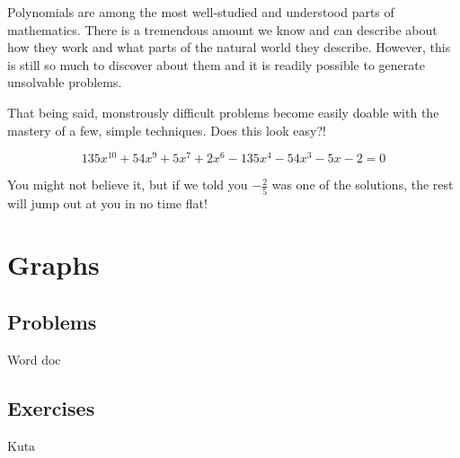 

Polynomials are among the most well-studied and understood parts of mathematics.
There is a tremendous amount we know and can describe about how they work
and what parts of the natural world they describe.  However, this is still so much
to discover about them and it is readily possible to generate unsolvable problems.

That being said, monstrously difficult problems become easily doable with the mastery
of a few, simple techniques.  Does this look easy?!


\begin{equation}
135x^{10} + 54x^9 + 5x^7 + 2x^6 - 135x^4 - 54x^3 - 5x - 2 = 0
\end{equation}

You might not believe it, but if we told you $-\frac{2}{5}$ was one of the solutions, 
the rest will jump out at you in no time flat!


\newpage
\chapterminitoc


\newpage
\section{Graphs}
\subsection{Problems}
Word doc
\newpage

\newpage
\subsection{Exercises}
Kuta



\newpage

